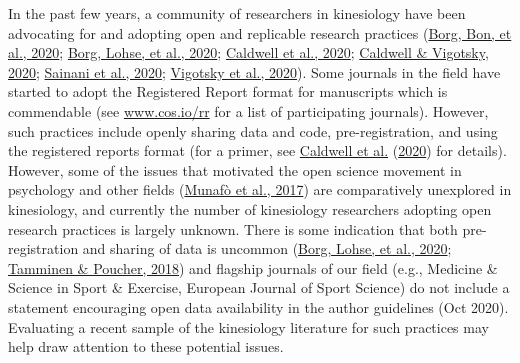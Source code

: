 \documentclass[]{cik}%
\begin{document}
In the past few years, a community of researchers in kinesiology have
been advocating for and adopting open and replicable research practices
(\protect\hyperlink{ref-Borg_Bon_Sainani_Baguley_Tierney_Drovandi_2020}{Borg,
Bon, et al., 2020};
\protect\hyperlink{ref-Borg_Lohse_Sainani_2020}{Borg, Lohse, et al.,
2020}; \protect\hyperlink{ref-caldwell_moving_2020}{Caldwell et al.,
2020}; \protect\hyperlink{ref-Caldwell_Vigotsky_2020}{Caldwell \&
Vigotsky, 2020}; \protect\hyperlink{ref-sainani2020}{Sainani et al.,
2020};
\protect\hyperlink{ref-Vigotsky_Nuckols_Heathers_Krieger_Schoenfeld_Steele_2020}{Vigotsky
et al., 2020}). Some journals in the field have started to adopt the
Registered Report format for manuscripts which is commendable (see
\url{www.cos.io/rr} for a list of participating journals). However, such
practices include openly sharing data and code, pre-registration, and
using the registered reports format (for a primer, see
\protect\hyperlink{ref-caldwell_moving_2020}{Caldwell et al.}
(\protect\hyperlink{ref-caldwell_moving_2020}{2020}) for details).
However, some of the issues that motivated the open science movement in
psychology and other fields
(\protect\hyperlink{ref-munafo_manifesto_2017}{Munafò et al., 2017}) are
comparatively unexplored in kinesiology, and currently the number of
kinesiology researchers adopting open research practices is largely
unknown. There is some indication that both pre-registration and sharing
of data is uncommon
(\protect\hyperlink{ref-Borg_Lohse_Sainani_2020}{Borg, Lohse, et al.,
2020}; \protect\hyperlink{ref-Tamminen_Poucher_2018}{Tamminen \&
Poucher, 2018}) and flagship journals of our field (e.g., Medicine \&
Science in Sport \& Exercise, European Journal of Sport Science) do not
include a statement encouraging open data availability in the author
guidelines (Oct 2020). Evaluating a recent sample of the kinesiology
literature for such practices may help draw attention to these potential
issues.
\end{document}
